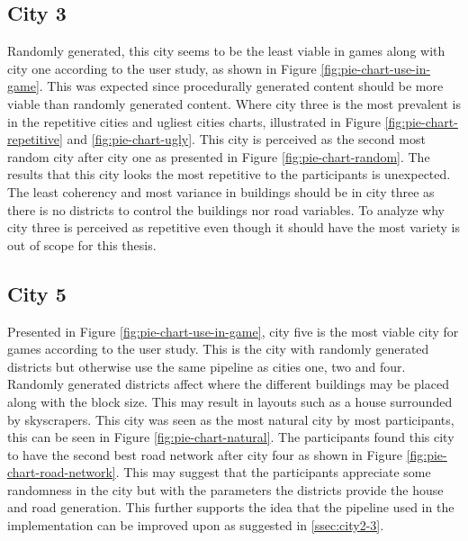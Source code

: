 	\subsection{City 3}
		Randomly generated, this city seems to be the least viable in games along with city one according to the user study, as shown in Figure \ref{fig:pie-chart-use-in-game}. This was expected since procedurally generated content should be more viable than randomly generated content. Where city three is the most prevalent is in the repetitive cities and ugliest cities charts, illustrated in Figure \ref{fig:pie-chart-repetitive} and \ref{fig:pie-chart-ugly}. This city is perceived as the second most random city after city one as presented in Figure \ref{fig:pie-chart-random}. The results that this city looks the most repetitive to the participants is unexpected. The least coherency and most variance in buildings should be in city three as there is no districts to control the buildings nor road variables. To analyze why city three is perceived as repetitive even though it should have the most variety is out of scope for this thesis.
	\subsection{City 5}
		Presented in Figure \ref{fig:pie-chart-use-in-game}, city five is the most viable city for games according to the user study. This is the city with randomly generated districts but otherwise use the same pipeline as cities one, two and four. Randomly generated districts affect where the different buildings may be placed along with the block size. This may result in layouts such as a house surrounded by skyscrapers. This city was seen as the most natural city by most participants, this can be seen in Figure \ref{fig:pie-chart-natural}. The participants found this city to have the second best road network after city four as shown in Figure \ref{fig:pie-chart-road-network}. This may suggest that the participants appreciate some randomness in the city but with the parameters the districts provide the house and road generation. This further supports the idea that the pipeline used in the implementation can be improved upon as suggested in \ref{ssec:city2-3}.
